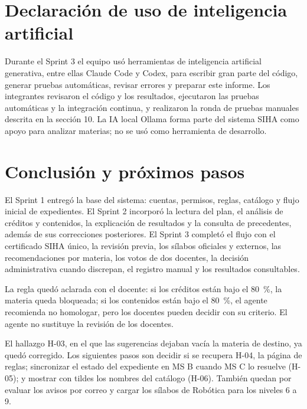 \section{Declaración de uso de inteligencia artificial}
Durante el Sprint 3 el equipo usó herramientas de inteligencia artificial generativa, entre ellas Claude Code y Codex, para escribir gran parte del código, generar pruebas automáticas, revisar errores y preparar este informe. Los integrantes revisaron el código y los resultados, ejecutaron las pruebas automáticas y la integración continua, y realizaron la ronda de pruebas manuales descrita en la sección 10. La IA local Ollama forma parte del sistema SIHA como apoyo para analizar materias; no se usó como herramienta de desarrollo.

\section{Conclusión y próximos pasos}
El Sprint 1 entregó la base del sistema: cuentas, permisos, reglas, catálogo y flujo inicial de expedientes. El Sprint 2 incorporó la lectura del plan, el análisis de créditos y contenidos, la explicación de resultados y la consulta de precedentes, además de sus correcciones posteriores. El Sprint 3 completó el flujo con el certificado SIHA único, la revisión previa, los sílabos oficiales y externos, las recomendaciones por materia, los votos de dos docentes, la decisión administrativa cuando discrepan, el registro manual y los resultados consultables.

La regla quedó aclarada con el docente: si los créditos están bajo el 80~\%, la materia queda bloqueada; si los contenidos están bajo el 80~\%, el agente recomienda no homologar, pero los docentes pueden decidir con su criterio. El agente no sustituye la revisión de los docentes.

El hallazgo H-03, en el que las sugerencias dejaban vacía la materia de destino, ya quedó corregido. Los siguientes pasos son decidir si se recupera H-04, la página de reglas; sincronizar el estado del expediente en MS B cuando MS C lo resuelve (H-05); y mostrar con tildes los nombres del catálogo (H-06). También quedan por evaluar los avisos por correo y cargar los sílabos de Robótica para los niveles 6 a 9.

